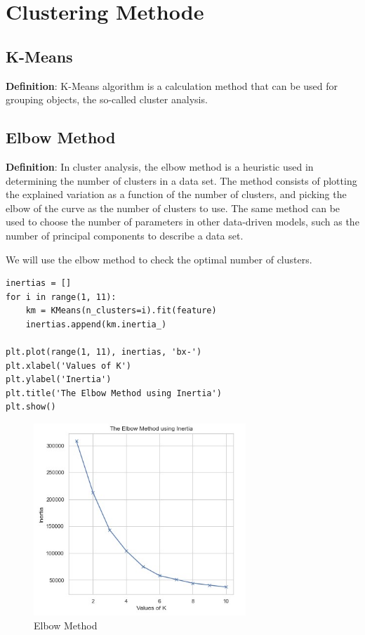 \documentclass{article}
\begin{document}
\section{Clustering Methode}
\subsection{K-Means}
\textbf{Definition}:
K-Means algorithm is a calculation method that can be used for grouping objects, the so-called cluster analysis.
\subsection{Elbow Method}
\textbf{Definition}:
In cluster analysis, the elbow method is a heuristic used in determining the number of clusters in a data set. The method consists of plotting the explained variation as a function of the number of clusters, and picking the elbow of the curve as the number of clusters to use. The same method can be used to choose the number of parameters in other data-driven models, such as the number of principal components to describe a data set.\\
\vspace{6cm}

We will use the elbow method to check the optimal number of clusters.
\begin{lstlisting}
inertias = []
for i in range(1, 11):
    km = KMeans(n_clusters=i).fit(feature)
    inertias.append(km.inertia_)
    
plt.plot(range(1, 11), inertias, 'bx-')
plt.xlabel('Values of K')
plt.ylabel('Inertia')
plt.title('The Elbow Method using Inertia')
plt.show()
\end{lstlisting}
\begin{figure}[htp]
    \centering
    \includegraphics[width=8cm]{Elbow.jpg}
    \caption{Elbow Method}
    \label{fig:Elbow Method}
\end{figure}
\end{document}
